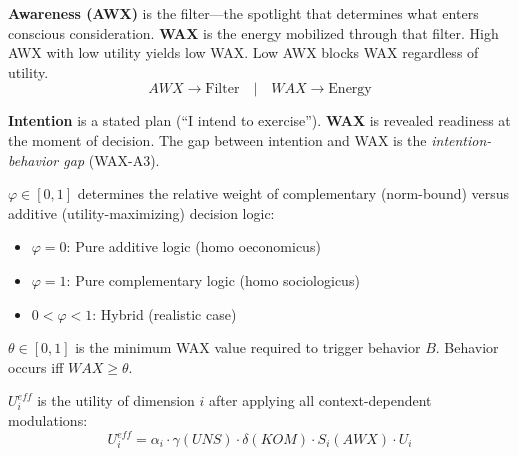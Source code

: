 \begin{definition}
\label{def:wax-not-awareness}
\textbf{Awareness (AWX)} is the filter---the spotlight that determines what enters conscious consideration.
\textbf{WAX} is the energy mobilized through that filter.
High AWX with low utility yields low WAX. Low AWX blocks WAX regardless of utility.
\[AWX \rightarrow \text{Filter} \quad | \quad WAX \rightarrow \text{Energy}\]
\end{definition}

\begin{definition}
\label{def:wax-not-intention}
\textbf{Intention} is a stated plan (``I intend to exercise'').
\textbf{WAX} is revealed readiness at the moment of decision.
The gap between intention and WAX is the \textit{intention-behavior gap} (WAX-A3).
\end{definition}

\begin{definition}
\label{def:phi}
$\varphi \in [0,1]$ determines the relative weight of complementary (norm-bound) versus additive (utility-maximizing) decision logic:
\begin{itemize}
\item $\varphi = 0$: Pure additive logic (homo oeconomicus)
\item $\varphi = 1$: Pure complementary logic (homo sociologicus)
\item $0 < \varphi < 1$: Hybrid (realistic case)
\end{itemize}
\end{definition}

\begin{definition}
\label{def:theta}
$\theta \in [0,1]$ is the minimum WAX value required to trigger behavior $B$. Behavior occurs iff $WAX \geq \theta$.
\end{definition}

\begin{definition}
\label{def:ueff}
$U_i^{eff}$ is the utility of dimension $i$ after applying all context-dependent modulations:
\begin{equation}
U_i^{eff} = \alpha_i \cdot \gamma(UNS) \cdot \delta(KOM) \cdot S_i(AWX) \cdot U_i
\end{equation}
\end{definition}


